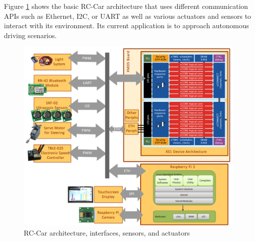 \documentclass [a4paper,final,conference,10pt]{IDAACS}
\begin{document}
Figure \ref{fig:arch} shows the basic RC-Car architecture that uses different communication APIs such as Ethernet, I2C, or UART as well as various actuators and sensors to interact with its environment. Its current application is to approach autonomous driving scenarios.
\begin{figure}[bth]
	\centering
	\includegraphics[scale=0.118]{images/hwarch.png}
	\caption{\label{fig:arch}RC-Car architecture, interfaces, sensors, and actuators}
\end{figure}



\end{document}
